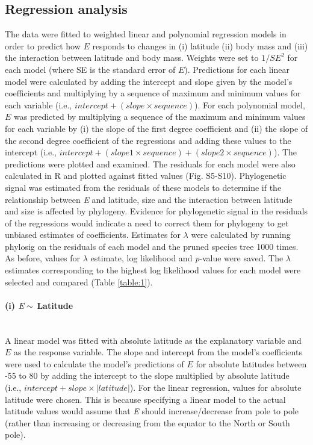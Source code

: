 \documentclass[11pt]{article}
\begin{document}
\begin{flushleft}
\subsection{Regression analysis}
The data were fitted to weighted linear and polynomial regression models in order to predict how \emph{$E$} responds to changes in (i) latitude (ii) body mass and (iii) the interaction between latitude and body mass. Weights were set to $1/SE^2$ for each model (where SE is the standard error of \emph{$E$}). Predictions for each linear model were calculated by adding the intercept and slope given by the model's coefficients and multiplying by a sequence of maximum and minimum values for each variable (i.e., $intercept + (slope \times sequence)$). For each polynomial model, \emph{$E$} was predicted by multiplying a sequence of the maximum and minimum values for each variable by (i) the slope of the first degree coefficient and (ii) the slope of the second degree coefficient of the regressions and adding these values to the intercept (i.e., $intercept + (slope 1 \times sequence) + (slope 2 \times sequence)$). The predictions were plotted and examined. The residuals for each model were also calculated in R and plotted against fitted values (Fig. S5-S10). Phylogenetic signal was estimated from the residuals of these models to determine if the relationship between \emph{E} and latitude, size and the interaction between latitude and size is affected by phylogeny. Evidence for phylogenetic signal in the residuals of the regressions would indicate a need to correct them for phylogeny to get unbiased estimates of coefficients. Estimates for $\lambda$ were calculated by running phylosig on the residuals of each model and the pruned species tree 1000 times. As before,  values for  $\lambda$ estimate, log likelihood and \emph{p}-value were saved. The  $\lambda$  estimates corresponding to the highest log likelihood values for each model were selected and compared (Table \ref{table:1}). 
\linebreak

\paragraph{(i) $\emph{E} \sim $ Latitude }\mbox{}\\
A linear model was fitted with absolute latitude as the explanatory variable and \emph{$E$} as the response variable. The slope and intercept from the model’s coefficients were used to calculate the model’s predictions of \emph{$E$} for absolute latitudes between -55 to 80 by adding the intercept to the slope multiplied by absolute latitude (i.e., $intercept + slope \times |latitude|$). For the linear regression, values for absolute latitude were chosen. This is because specifying a linear model to the actual latitude values would assume that \emph{E} should increase/decrease from pole to pole (rather than increasing or decreasing from the equator to the North or South pole).
\linebreak


\end{flushleft}
\end{document}
